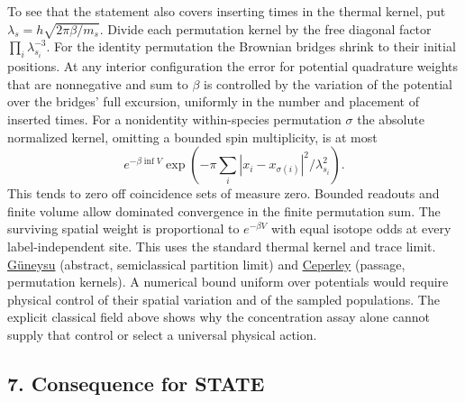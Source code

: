 \documentclass[11pt,a4paper]{article}
\begin{document}
To see that the statement also covers inserting times in the thermal
kernel, put \(\lambda_s=h\sqrt{2\pi\beta/m_s}\). Divide each permutation
kernel by the free diagonal factor \(\prod_i\lambda_{s_i}^{-3}\). For
the identity permutation the Brownian bridges shrink to their initial
positions. At any interior configuration the error for potential
quadrature weights that are nonnegative and sum to \(\beta\) is
controlled by the variation of the potential over the bridges' full
excursion, uniformly in the number and placement of inserted times. For
a nonidentity within-species permutation \(\sigma\) the absolute
normalized kernel, omitting a bounded spin multiplicity, is at most \[
 e^{-\beta\inf V}
 \exp\!\left(-\pi\sum_i |x_i-x_{\sigma(i)}|^2/\lambda_{s_i}^2\right).
\] This tends to zero off coincidence sets of measure zero. Bounded
readouts and finite volume allow dominated convergence in the finite
permutation sum. The surviving spatial weight is proportional to
\(e^{-\beta V}\) with equal isotope odds at every label-independent
site. This uses the standard thermal kernel and trace limit.
\href{https://arxiv.org/abs/1701.04998}{Güneysu} (abstract,
semiclassical partition limit) and
\href{https://people.physics.illinois.edu/Ceperley/papers/059a.pdf}{Ceperley}
(passage, permutation kernels). A numerical bound uniform over
potentials would require physical control of their spatial variation and
of the sampled populations. The explicit classical field above shows why
the concentration assay alone cannot supply that control or select a
universal physical action.

\subsection{7. Consequence for STATE}\label{consequence-for-state}
\end{document}
